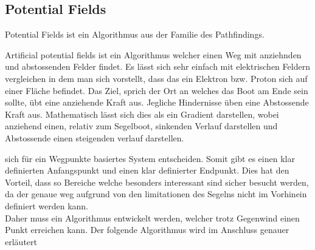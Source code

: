 \subsection{Potential Fields} 
Potential Fields ist ein Algorithmus aus der Familie des Pathfindings.

Artificial potential fields ist ein Algorithmus  welcher einen Weg mit anziehnden und abstossenden Felder findet. Es lässt sich sehr einfach mit elektrischen Feldern vergleichen in dem man sich vorstellt, dass das ein Elektron bzw. Proton sich auf einer Fläche befindet. Das Ziel, sprich der Ort an welches das Boot am Ende sein sollte, übt eine anziehende Kraft aus. Jegliche Hindernisse üben eine Abstossende Kraft aus. Mathematisch lässt sich dies als ein Gradient darstellen, wobei anziehend einen, relativ zum Segelboot, sinkenden Verlauf darstellen und Abstossende einen steigenden verlauf darstellen.

sich für ein Wegpunkte basiertes System entscheiden. Somit gibt es einen klar definierten Anfangspunkt und einen klar definierter Endpunkt. Dies hat den Vorteil, dass so Bereiche welche besonders interessant sind sicher besucht werden, da der genaue weg aufgrund von den limitationen des Segelns nicht im Vorhinein definiert werden kann. \\
Daher muss ein Algorithmus entwickelt werden, welcher trotz Gegenwind einen Punkt erreichen kann. Der folgende Algorithmus wird im Anschluss genauer erläutert

